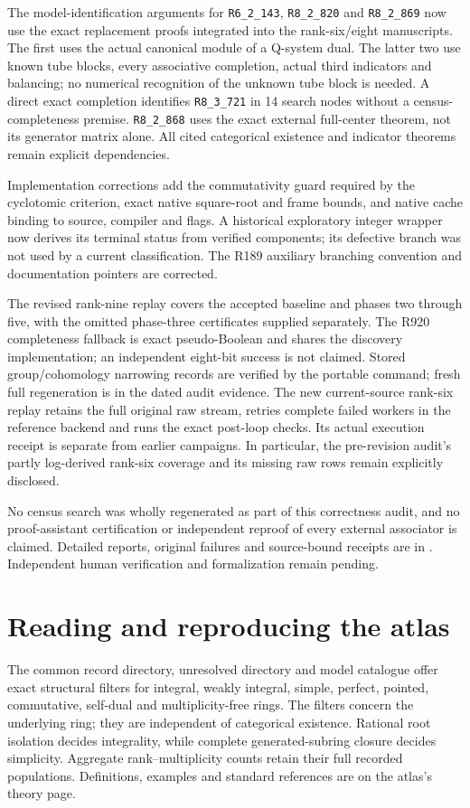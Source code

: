 \documentclass[11pt,a4paper]{article}
\begin{document}
The model-identification arguments for \texttt{R6\_2\_143},
\texttt{R8\_2\_820} and \texttt{R8\_2\_869} now use the exact replacement
proofs integrated into the rank-six/eight manuscripts. The first uses the
actual canonical module of a Q-system dual. The latter two use known tube
blocks, every associative completion, actual third indicators and balancing;
no numerical recognition of the unknown tube block is needed.
A direct exact completion identifies \texttt{R8\_3\_721} in 14 search nodes
without a census-completeness premise. \texttt{R8\_2\_868} uses the exact
external full-center theorem, not its generator matrix alone. All cited
categorical existence and indicator theorems remain explicit dependencies.

Implementation corrections add the commutativity guard required by the
cyclotomic criterion, exact native square-root and frame bounds, and native
cache binding to source, compiler and flags. A historical exploratory
integer wrapper now derives its terminal status from verified components;
its defective branch was not used by a current classification. The R189
auxiliary branching convention and documentation pointers are corrected.

The revised rank-nine replay covers the accepted baseline and phases two
through five, with the omitted phase-three certificates supplied separately.
The R920 completeness fallback is exact pseudo-Boolean and shares the
discovery implementation; an independent eight-bit success is not claimed.
Stored group/cohomology narrowing records are verified by the portable
command; fresh full regeneration is in the dated audit evidence.
The new current-source rank-six replay retains the full original raw stream,
retries complete failed workers in the reference backend and runs the exact
post-loop checks. Its actual execution receipt is separate from earlier
campaigns. In particular, the pre-revision audit's partly log-derived
rank-six coverage and its missing raw rows remain explicitly disclosed.

No census search was wholly regenerated as part of this correctness audit,
and no proof-assistant certification or independent reproof of every external
associator is claimed. Detailed reports, original failures and source-bound
receipts are in . Independent human
verification and formalization remain pending.

\section{Reading and reproducing the atlas}
The common record directory, unresolved directory and model catalogue offer
exact structural filters for integral, weakly integral, simple, perfect,
pointed, commutative, self-dual and multiplicity-free rings. The filters concern
the underlying ring; they are independent of categorical existence. Rational
root isolation decides integrality, while complete generated-subring closure
decides simplicity. Aggregate rank--multiplicity counts retain their full
recorded populations. Definitions, examples and standard references are on the
atlas's theory page.
\end{document}
